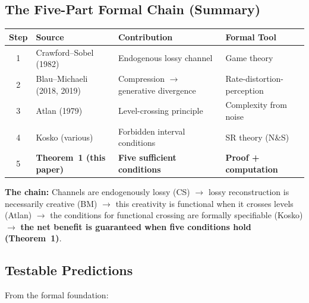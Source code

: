 \documentclass[12pt,letterpaper]{article}
\theoremstyle{definition}
\theoremstyle{remark}
\begin{document}
\subsection{The Five-Part Formal Chain (Summary)}

\begin{center}
\begin{tabular}{@{}clll@{}}
\toprule
\textbf{Step} & \textbf{Source} & \textbf{Contribution} & \textbf{Formal Tool} \\
\midrule
1 & Crawford--Sobel (1982) & Endogenous lossy channel & Game theory \\
2 & Blau--Michaeli (2018, 2019) & Compression $\to$ generative divergence & Rate-distortion-perception \\
3 & Atlan (1979) & Level-crossing principle & Complexity from noise \\
4 & Kosko (various) & Forbidden interval conditions & SR theory (N\&S) \\
5 & \textbf{Theorem~1 (this paper)} & \textbf{Five sufficient conditions} & \textbf{Proof + computation} \\
\bottomrule
\end{tabular}
\end{center}

\textbf{The chain:} Channels are endogenously lossy (CS) $\to$ lossy reconstruction is necessarily creative (BM) $\to$ this creativity is functional when it crosses levels (Atlan) $\to$ the conditions for functional crossing are formally specifiable (Kosko) $\to$ \textbf{the net benefit is guaranteed when five conditions hold (Theorem~1)}.


\subsection{Testable Predictions}

From the formal foundation:
\end{document}
